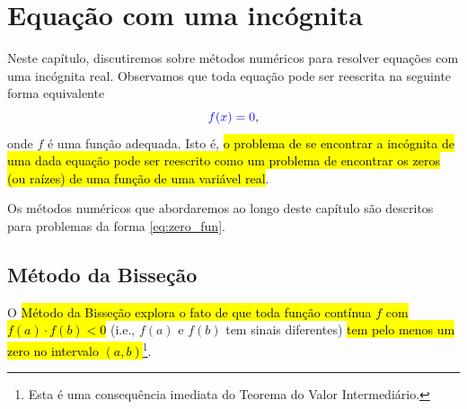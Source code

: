 
\chapter{Equação com uma incógnita}\label{cap_eq1d}
\thispagestyle{fancy}

Neste capítulo, discutiremos sobre métodos numéricos para resolver equações com uma incógnita real. Observamos que toda equação pode ser reescrita na seguinte forma equivalente
\begin{equation}\label{eq:zero_fun}
  {\color{blue}f(x) = 0},
\end{equation}
onde $f$ é uma função adequada. Isto é, \hl{o problema de se encontrar a incógnita de uma dada equação pode ser reescrito como um problema de encontrar os zeros (ou raízes) de uma função de uma variável real}.

Os métodos numéricos que abordaremos ao longo deste capítulo são descritos para problemas da forma \eqref{eq:zero_fun}.

\section{Método da Bisseção}\label{cap_eq1d_sec_bissec}

O \hl{Método da Bisseção explora o fato de que toda função contínua $f$ com $f(a)\cdot f(b) < 0$} (i.e., $f(a)$ e $f(b)$ tem sinais diferentes) \hl{tem pelo menos um zero no intervalo $(a, b)$}\footnote{Esta é uma consequência imediata do Teorema do Valor Intermediário.}.

